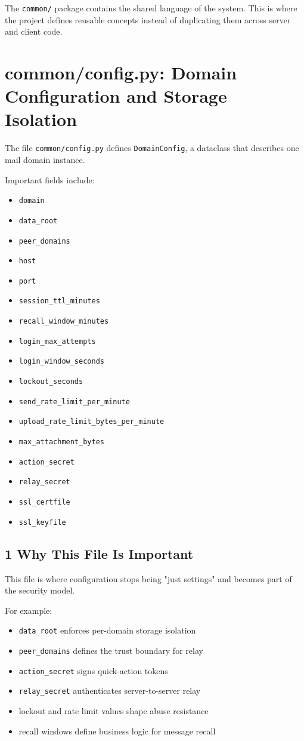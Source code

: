 \documentclass[11pt,a4paper]{article}
\begin{document}
The \nolinkurl{common/} package contains the shared language of the system. This is where the project defines reusable concepts instead of duplicating them across server and client code.


\section{common/config.py: Domain Configuration and Storage Isolation}

The file \nolinkurl{common/config.py} defines \nolinkurl{DomainConfig}, a dataclass that describes one mail domain instance.

Important fields include:

\begin{itemize}
\item \nolinkurl{domain}
\item \nolinkurl{data_root}
\item \nolinkurl{peer_domains}
\item \nolinkurl{host}
\item \nolinkurl{port}
\item \nolinkurl{session_ttl_minutes}
\item \nolinkurl{recall_window_minutes}
\item \nolinkurl{login_max_attempts}
\item \nolinkurl{login_window_seconds}
\item \nolinkurl{lockout_seconds}
\item \nolinkurl{send_rate_limit_per_minute}
\item \nolinkurl{upload_rate_limit_bytes_per_minute}
\item \nolinkurl{max_attachment_bytes}
\item \nolinkurl{action_secret}
\item \nolinkurl{relay_secret}
\item \nolinkurl{ssl_certfile}
\item \nolinkurl{ssl_keyfile}
\end{itemize}

\subsection{1 Why This File Is Important}

This file is where configuration stops being "just settings" and becomes part of the security model.

For example:

\begin{itemize}
\item \nolinkurl{data_root} enforces per-domain storage isolation
\item \nolinkurl{peer_domains} defines the trust boundary for relay
\item \nolinkurl{action_secret} signs quick-action tokens
\item \nolinkurl{relay_secret} authenticates server-to-server relay
\item lockout and rate limit values shape abuse resistance
\item recall windows define business logic for message recall
\end{itemize}
\end{document}
